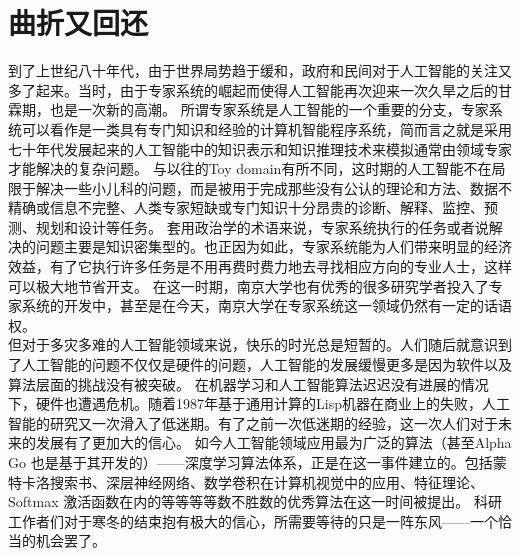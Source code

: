 \documentclass[12pt]{ctexart}
\begin{document}
\section{曲折又回还}
\indent 到了上世纪八十年代，由于世界局势趋于缓和，政府和民间对于人工智能的关注又多了起来。当时，由于专家系统的崛起而使得人工智能再次迎来一次久旱之后的甘霖期，也是一次新的高潮。
所谓专家系统是人工智能的一个重要的分支，专家系统可以看作是一类具有专门知识和经验的计算机智能程序系统，简而言之就是采用七十年代发展起来的人工智能中的知识表示和知识推理技术来模拟通常由领域专家才能解决的复杂问题。
与以往的Toy domain有所不同，这时期的人工智能不在局限于解决一些小儿科的问题，而是被用于完成那些没有公认的理论和方法、数据不精确或信息不完整、人类专家短缺或专门知识十分昂贵的诊断、解释、监控、预测、规划和设计等任务。
套用政治学的术语来说，专家系统执行的任务或者说解决的问题主要是知识密集型的。也正因为如此，专家系统能为人们带来明显的经济效益，有了它执行许多任务是不用再费时费力地去寻找相应方向的专业人士，这样可以极大地节省开支。
在这一时期，南京大学也有优秀的很多研究学者投入了专家系统的开发中，甚至是在今天，南京大学在专家系统这一领域仍然有一定的话语权。\\
\indent 但对于多灾多难的人工智能领域来说，快乐的时光总是短暂的。人们随后就意识到了人工智能的问题不仅仅是硬件的问题，人工智能的发展缓慢更多是因为软件以及算法层面的挑战没有被突破。
在机器学习和人工智能算法迟迟没有进展的情况下，硬件也遭遇危机。随着1987年基于通用计算的Lisp机器在商业上的失败，人工智能的研究又一次滑入了低迷期。有了之前一次低迷期的经验，这一次人们对于未来的发展有了更加大的信心。
如今人工智能领域应用最为广泛的算法（甚至Alpha Go \cite{name7}也是基于其开发的）——深度学习算法体系，正是在这一事件建立的。包括蒙特卡洛搜索书、深层神经网络、数学卷积在计算机视觉中的应用、特征理论、Softmax 激活函数在内的等等等等数不胜数的优秀算法在这一时间被提出。
科研工作者们对于寒冬的结束抱有极大的信心，所需要等待的只是一阵东风——一个恰当的机会罢了。\\
\end{document}
